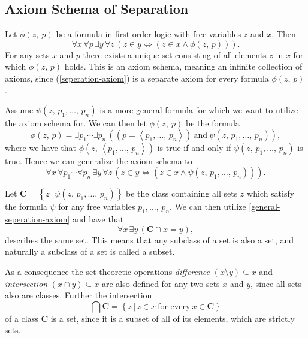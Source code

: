 \documentclass[../../main.tex]{subfiles}
\begin{document}
\subsection{Axiom Schema of Separation}\label{ZF3}
Let $\phi(z,\ p)$ be a formula in first order logic with free variables $z$ and $x$. Then
\begin{equation}\label{seperation-axiom}
    \forall x\, \forall p\, \exists y\, \forall z\, \left(z \in y \iff \left(z \in x \wedge \phi(z,\, p)\right)\right).
\end{equation}
For any sets $x$ and $p$ there exists a unique set consisting of all elements $z$ in $x$ for which $\phi(z,\, p)$ holds.
This is an axiom schema, meaning an infinite collection of axioms, since (\ref{seperation-axiom}) is a separate axiom for every formula $\phi(z,\, p)$.

Assume $\psi(z,\, p_1,\ldots,\, p_n)$ is a more general formula for which we want to utilize the axiom schema for.
We can then let $\phi(z,\ p)$ be the formula
$$\phi(z,\, p) = \exists p_1 \cdots \exists p_n\, \left(\left(p = \left<p_1,\ldots,\, p_n\right>\right) \ \text{and} \ \psi(z,\, p_1,\ldots,\, p_n)\right),$$
where we have that $\phi(z,\, \left<p_1,\ldots,\, p_n\right>)$ is true if and only if $\psi(z,\, p_1,\ldots,\, p_n)$ is true.
Hence we can generalize the axiom schema to 
\begin{equation}\label{general-seperation-axiom}
    \forall x\, \forall p_1 \cdots \forall p_n\, \exists y\, \forall z\, \left(z \in y \iff \left(z \in x \wedge \psi(z,\, p_1,\ldots,\, p_n)\right)\right).
\end{equation}

Let $\mathbf{C} = \left\{z \,\vert\, \psi(z,\, p_1,\ldots,\, p_n)\right\}$ be the class containing all sets $z$ which satisfy the formula $\psi$ for any free variables $p_1,\ldots,\, p_n$.
We can then utilize \ref{general-seperation-axiom} and have that
$$\forall x \, \exists y \, \left(\mathbf{C} \cap x = y\right),$$
describes the same set.
This means that any subclass of a set is also a set, and naturally a subclass of a set is called a subset. 

As a consequence the set theoretic operations \textit{difference} $\left(x \setminus y\right) \subseteq x$ and \textit{intersection} $\left(x \cap y\right) \subseteq x$ are also defined for any two sets $x$ and $y$,
since all sets also are classes.
Further the intersection 
$$\bigcap \mathbf{C} = \left\{z \,\vert\, z \in x \ \text{for every}\ x \in \mathbf{C}\right\}$$
of a class $\mathbf{C}$ is a set, since it is a subset of all of its elements, which are strictly sets. \cite[pp.5-6]{Jec78}
\end{document}

